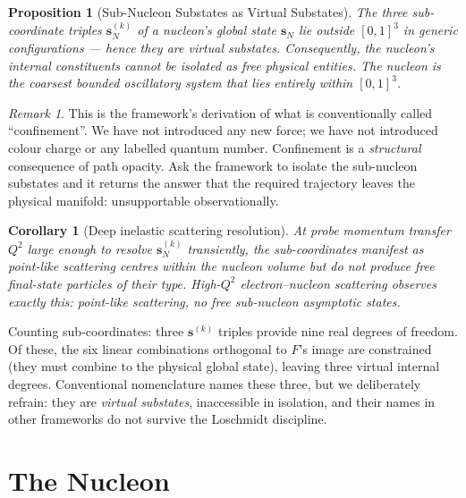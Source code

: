 \documentclass[11pt,a4paper]{article}
\newtheorem{proposition}[theorem]{Proposition}
\newtheorem{corollary}[theorem]{Corollary}
\theoremstyle{definition}
\theoremstyle{remark}
\newtheorem{remark}[theorem]{Remark}
\begin{document}
\begin{proposition}[Sub-Nucleon Substates as Virtual Substates]
\label{prop:subnucvirt}
The three sub-coordinate triples $\mathbf{s}_N^{(k)}$ of a nucleon's global state $\mathbf{s}_N$ lie outside $[0,1]^3$ in generic configurations --- hence they are virtual substates. Consequently, the nucleon's internal constituents \emph{cannot be isolated as free physical entities}. The nucleon is the coarsest bounded oscillatory system that lies entirely within $[0,1]^3$.
\end{proposition}

\begin{remark}
This is the framework's derivation of what is conventionally called ``confinement''. We have not introduced any new force; we have not introduced colour charge or any labelled quantum number. Confinement is a \emph{structural} consequence of path opacity. Ask the framework to isolate the sub-nucleon substates and it returns the answer that the required trajectory leaves the physical manifold: unsupportable observationally.
\end{remark}

\begin{corollary}[Deep inelastic scattering resolution]
\label{cor:dis}
At probe momentum transfer $Q^2$ large enough to resolve $\mathbf{s}_N^{(k)}$ transiently, the sub-coordinates manifest as point-like scattering centres within the nucleon volume but do not produce free final-state particles of their type. High-$Q^2$ electron--nucleon scattering \citep{friedman1972} observes exactly this: point-like scattering, no free sub-nucleon asymptotic states.
\end{corollary}

Counting sub-coordinates: three $\mathbf{s}^{(k)}$ triples provide nine real degrees of freedom. Of these, the six linear combinations orthogonal to $F$'s image are constrained (they must combine to the physical global state), leaving three virtual internal degrees. Conventional nomenclature names these three, but we deliberately refrain: they are \emph{virtual substates}, inaccessible in isolation, and their names in other frameworks do not survive the Loschmidt discipline.

\part{The Nucleon}
\end{document}
